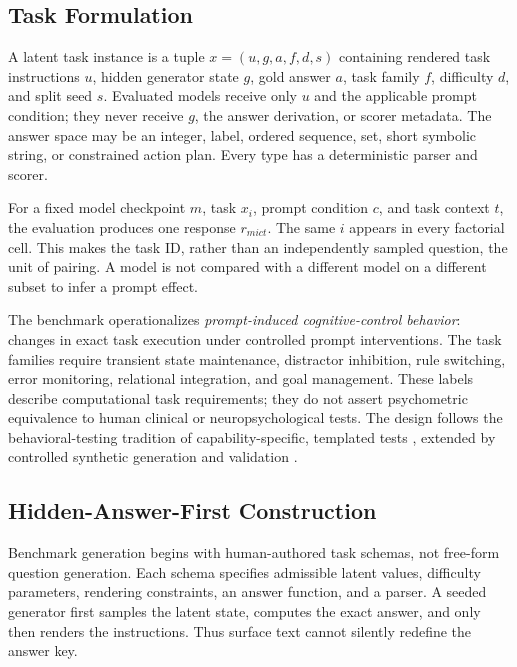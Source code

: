 \documentclass[sigconf]{acmart}
\begin{document}
\subsection{Task Formulation}

A latent task instance is a tuple
$x=(u,g,a,f,d,s)$ containing rendered task instructions $u$, hidden generator
state $g$, gold answer $a$, task family $f$, difficulty $d$, and split seed
$s$. Evaluated models receive only $u$ and the applicable prompt condition;
they never receive $g$, the answer derivation, or scorer metadata. The answer
space may be an integer, label, ordered sequence, set, short symbolic string,
or constrained action plan. Every type has a deterministic parser and scorer.

For a fixed model checkpoint $m$, task $x_i$, prompt condition $c$, and task
context $t$, the evaluation produces one response
$r_{mict}$. The same $i$ appears in every factorial cell. This makes the task
ID, rather than an independently sampled question, the unit of pairing. A model
is not compared with a different model on a different subset to infer a prompt
effect.

The benchmark operationalizes \emph{prompt-induced cognitive-control
behavior}: changes in exact task execution under controlled prompt
interventions. The task families require transient state maintenance,
distractor inhibition, rule switching, error monitoring, relational
integration, and goal management. These labels describe computational task
requirements; they do not assert psychometric equivalence to human clinical or
neuropsychological tests. The design follows the behavioral-testing tradition
of capability-specific, templated tests \cite{ribeiro2020checklist}, extended
by controlled synthetic generation and validation \cite{zhao2024syntheval}.

\subsection{Hidden-Answer-First Construction}

Benchmark generation begins with human-authored task schemas, not free-form
question generation. Each schema specifies admissible latent values,
difficulty parameters, rendering constraints, an answer function, and a
parser. A seeded generator first samples the latent state, computes the exact
answer, and only then renders the instructions. Thus surface text cannot
silently redefine the answer key.
\end{document}
